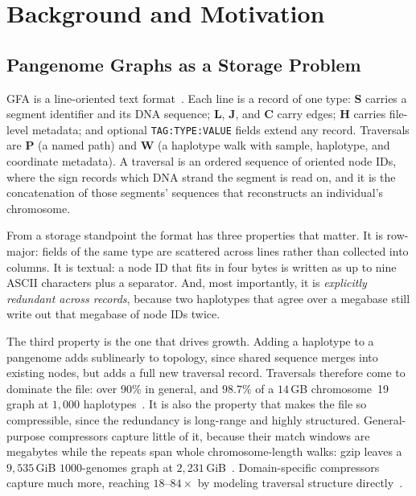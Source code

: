 \section{Background and Motivation}
\label{sec:background}

\subsection{Pangenome Graphs as a Storage Problem}
\label{subsec:bg-format}

GFA is a line-oriented text format~\cite{gfaspec}. Each line is a record of one
type: \textbf{S} carries a segment identifier and its DNA sequence; \textbf{L},
\textbf{J}, and \textbf{C} carry edges; \textbf{H} carries file-level metadata;
and optional \texttt{TAG:TYPE:VALUE} fields extend any record. Traversals are
\textbf{P} (a named path) and \textbf{W} (a haplotype walk with sample,
haplotype, and coordinate metadata). A traversal is an ordered sequence of
oriented node IDs, where the sign records which DNA strand the segment is read
on, and it is the concatenation of those segments' sequences that reconstructs an
individual's chromosome.

From a storage standpoint the format has three properties that matter. It is
row-major: fields of the same type are scattered across lines rather than
collected into columns. It is textual: a node ID that fits in four bytes is
written as up to nine ASCII characters plus a separator. And, most importantly,
it is \emph{explicitly redundant across records}, because two haplotypes that
agree over a megabase still write out that megabase of node IDs twice.

The third property is the one that drives growth. Adding a haplotype to a
pangenome adds sublinearly to topology, since shared sequence merges into existing
nodes, but adds a full new traversal record. Traversals therefore come to dominate
the file: over $90\%$ in general, and $98.7\%$ of a $14$\,GB chromosome~19 graph
at $1{,}000$ haplotypes~\cite{heringer2025human}. It is also the property that
makes the file so compressible, since the redundancy is long-range and highly
structured. General-purpose compressors capture little of it, because their match
windows are megabytes while the repeats span whole chromosome-length walks: gzip
leaves a $9{,}535$\,GiB $1000$-genomes graph at $2{,}231$\,GiB~\cite{siren2022gbz}.
Domain-specific compressors capture much more, reaching $18$--$84\times$ by
modeling traversal structure directly~\cite{siren2022gbz,gfaz2026}.

